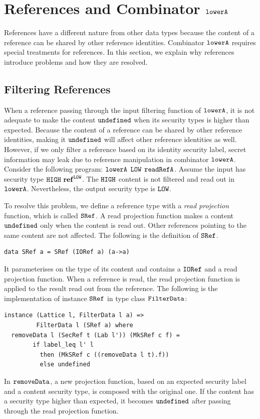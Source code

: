 \documentclass[a4paper]{report}
\newcommand{\co}[1]{$\cod{#1}$}
\begin{document}
\section{References and Combinator \co{lowerA}}
\label{chap4:reference}

References have a different nature from other data types because the content of a reference can be shared
by other reference identities. 
Combinator \co{lowerA} requires special treatments for references.
In this section, we explain why references introduce problems and how they are resolved.

\subsection{Filtering References}
\label{chap4:readproject}

When a reference passing through the input filtering function of \co{lowerA},
it is not adequate to make the content \co{undefined} when its security types is 
higher than expected.
Because the content of a reference can be shared by other reference identities,
making it \co{undefined} will affect other reference identities as well.
However, if we only filter a reference based on its identity security label, secret information
may leak due to reference manipulation in combinator \co{lowerA}.
Consider the following program: \co{lowerA} \co{LOW} \co{readRefA}.
Assume the input has security type $\cod{HIGH}\ \mathbf{ref}^{\cod{LOW}}$.
The \co{HIGH} content is not filtered and read out in \co{lowerA}.
Nevertheless, the output security type is \co{LOW}.

To resolve this problem, we define a reference type with a {\em read projection} function, which is
called \co{SRef}.
A read projection function makes a content \co{undefined} only when the content is read out.
Other references pointing to the same content are not affected.
The following is the definition of \co{SRef}.
\begin{Verbatim}[fontsize=\footnotesize]
data SRef a = SRef (IORef a) (a->a)
\end{Verbatim}
It parameterises on the type of its content and contains a \co{IORef} and a read projection function.
When a reference is read, the read projection function is applied to the result read out from the reference.
The following is the implementation of instance \co{SRef} in type class \co{FilterData}:
\begin{Verbatim}[fontsize=\footnotesize]
instance (Lattice l, FilterData l a) =>
         FilterData l (SRef a) where
  removeData l (SecRef t (Lab l')) (MkSRef c f) =
        if label_leq l' l
          then (MkSRef c ((removeData l t).f))
          else undefined
\end{Verbatim}
In \co{removeData}, a new projection function,
based on an expected security label and a content security type,
is composed with the original one.
If the content has a security type higher than expected, it becomes \co{undefined} after passing 
through the read projection function.
\end{document}
